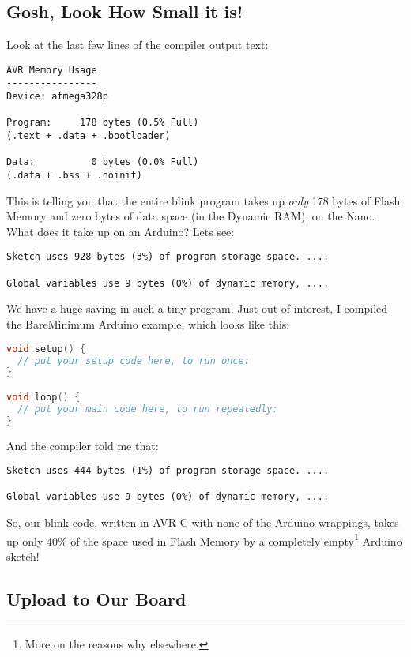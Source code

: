 \subsection{Gosh, Look How Small it
is!}\label{gosh-look-how-small-it-is}

Look at the last few lines of the compiler output text:

\begin{lstlisting}[firstnumber=19]
AVR Memory Usage
----------------
Device: atmega328p

Program:     178 bytes (0.5% Full)
(.text + .data + .bootloader)

Data:          0 bytes (0.0% Full)
(.data + .bss + .noinit)
\end{lstlisting}

This is telling you that the entire blink program takes up \emph{only}
178 bytes of Flash Memory and zero bytes of data space (in the Dynamic
RAM), on the Nano. What does it take up on an Arduino? Lets see:

\begin{lstlisting}
Sketch uses 928 bytes (3%) of program storage space. ....

Global variables use 9 bytes (0%) of dynamic memory, ....
\end{lstlisting}

We have a huge saving in such a tiny program. Just out of interest, I
compiled the BareMinimum Arduino example, which looks like this:

\begin{lstlisting}[language=C]
void setup() {
  // put your setup code here, to run once:
}

void loop() {
  // put your main code here, to run repeatedly:
}
\end{lstlisting}

And the compiler told me that:

\begin{lstlisting}
Sketch uses 444 bytes (1%) of program storage space. ....

Global variables use 9 bytes (0%) of dynamic memory, ....
\end{lstlisting}

So, our blink code, written in AVR C with none of the Arduino wrappings,
takes up only 40\% of the space used in Flash Memory by a completely
empty\footnote{More on the reasons why elsewhere.} Arduino sketch!

\subsection{Upload to Our Board}\label{upload-to-our-board}

